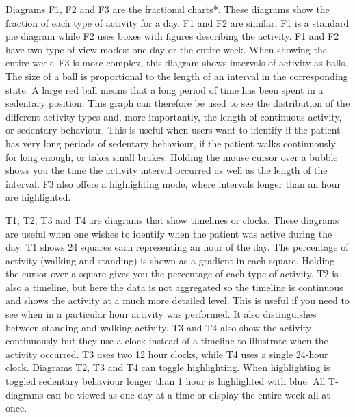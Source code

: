 Diagrams F1, F2 and F3 are the fractional charts*. These diagrams show the fraction of each type of activity for a day. F1 and F2 are similar, F1 is a standard pie diagram while F2 uses boxes with figures describing the activity. F1 and F2 have two type of view modes: one day or the entire week. When showing the entire week. F3 is more complex, this diagram shows intervals of activity as balls. The size of a ball is proportional to the length of an interval in the corresponding state. A large red ball means that a long period of time has been spent in a sedentary position. This graph can therefore be used to see the distribution of the different activity types and, more importantly, the length of continuous activity, or sedentary behaviour. This is useful when users want to identify if the patient has very long periods of sedentary behaviour, if the patient walks continuously for long enough, or takes small brakes. Holding the mouse cursor over a bubble shows you the time the activity interval occurred as well as the length of the interval. F3 also offers a highlighting mode, where intervals longer than an hour are highlighted.

T1, T2, T3 and T4 are diagrams that show timelines or clocks. These diagrams are useful when one wishes to identify when the patient was active during the day. T1 shows 24 squares each representing an hour of the day. The percentage of activity (walking and standing) is shown as a gradient in each square. Holding the cursor over a square gives you the percentage of each type of activity. T2 is also a timeline, but here the data is not aggregated so the timeline is continuous and shows the activity at a much more detailed level. This is useful if you need to see when in a particular hour activity was performed. It also distinguishes between standing and walking activity. T3 and T4 also show the activity continuously but they use a clock instead of a timeline to illustrate when the activity occurred. T3 uses two 12 hour clocks, while T4 uses a single 24-hour clock. Diagrams T2, T3 and T4 can toggle highlighting. When highlighting is toggled sedentary behaviour longer than 1 hour is highlighted with blue. All T-diagrams can be viewed as one day at a time or display the entire week all at once. 
